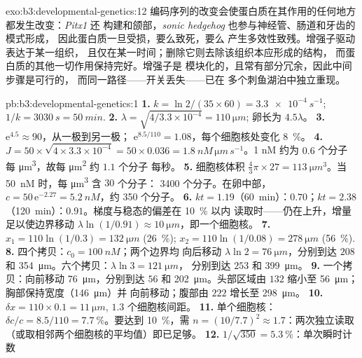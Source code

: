 \begin{solution}{exo:b3:developmental-genetics:12}
编码序列的改变会使蛋白质在其作用的任何地方都发生改变：\emph{Pitx1} 还
构建和颌部，\emph{sonic hedgehog} 也参与神经管、肠道和牙齿的模式形成，
因此蛋白质一旦受损，要么致死，要么
产生多效性致残。增强子驱动表达于某一组织，
且仅在某一时间；删除它则去除该组织本应形成的结构，
而蛋白质的其他一切作用保持完好。增强子是
模块化的，且常有部分冗余，因此中间步骤是可行的，
而同一路径——开关丢失——已在
多个刺鱼湖泊中独立重现。
\end{solution}

\begin{solution}{pb:b3:developmental-genetics:1}
\textbf{1.} $k = \ln 2/(35\times 60) = \qty{3.3e-4}{s^{-1}}$; $1/k =
\qty{3030}{s} = \qty{50}{min}$.
\textbf{2.} $\lambda = \sqrt{4/3.3\times 10^{-4}} = \qty{110}{\micro m}$;
卵长为 $4.5\lambda$。
\textbf{3.} $\mathrm{e}^{4.5} \approx 90$，从一极到另一极；
$\mathrm{e}^{8.5/110} = 1.08$，每个细胞核处变化 \qty{8}{\%}。
\textbf{4.} $J = 50\times\sqrt{4\times 3.3\times 10^{-4}} = 50\times
0.036 = \qty{1.8}{nM\,\micro m\,s^{-1}}$。1 nM 约为 $0.6$ 个分子
每 \unit{\micro m^3}，故每 \unit{\micro m^2} 约 $1.1$ 个分子
每秒。
\textbf{5.} 细胞核体积 $\tfrac{4}{3}\pi\times 27 = \qty{113}{\micro
m^3}$。当 \qty{50}{nM} 时，每 \unit{\micro m^3} 含 $30$ 个分子：
\num{3400} 个分子。在卵中部，$c = 50\,\mathrm{e}^{-2.27} =
\qty{5.2}{nM}$，约 \num{350} 个分子。
\textbf{6.} $kt = 1.19$（\qty{60}{min}）：$0.70$；$kt = 2.38$
（\qty{120}{min}）：$0.91$。梯度与稳态的偏差在 \qty{10}{\%} 以内
读取时——仍在上升，增量足以使边界移动
$\lambda\ln(1/0.91) \approx \qty{10}{\micro m}$，即一个细胞核。
\textbf{7.} $x_{1} = 110\ln(1/0.3) = \qty{132}{\micro m}$
(\qty{26}{\%}); $x_{2} = 110\ln(1/0.08) = \qty{278}{\micro m}$
(\qty{56}{\%}).
\textbf{8.} 四个拷贝：$c_{0} = \qty{100}{nM}$；两个边界均
向后移动 $\lambda\ln 2 = \qty{76}{\micro m}$，分别到达 $208$ 和
\qty{354}{\micro m}。六个拷贝：$\lambda\ln 3 = \qty{121}{\micro m}$，
分别到达 $253$ 和 \qty{399}{\micro m}。
\textbf{9.} 一个拷贝：向前移动 \qty{76}{\micro m}，分别到达 $56$ 和
\qty{202}{\micro m}。头部区域由 $132$ 缩小至
\qty{56}{\micro m}；胸部保持宽度（\qty{146}{\micro m}）并
向前移动；腹部由 $222$ 增长至 \qty{298}{\micro m}。
\textbf{10.} $\delta x = 110\times 0.1 = \qty{11}{\micro m}$, $1.3$
个细胞核间距。
\textbf{11.} 单个细胞核：$\delta c/c = 8.5/110 = \qty{7.7}{\%}$。要达到
\qty{10}{\%}，需 $n = (10/7.7)^{2} \approx 1.7$：两次独立读取
（或取相邻两个细胞核的平均值）即已足够。
\textbf{12.} $1/\sqrt{350} = \qty{5.3}{\%}$：单次瞬时计数

\end{solution}

